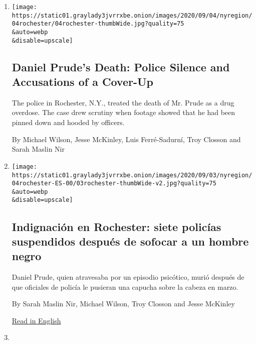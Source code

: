 \begin{enumerate}
\def\labelenumi{\arabic{enumi}.}
\item
  \href{/2020/09/04/nyregion/rochester-police-daniel-prude.html}{}

  \texttt{[image: https://static01.graylady3jvrrxbe.onion/images/2020/09/04/nyregion/04rochester/04rochester-thumbWide.jpg?quality=75\\\&auto=webp\\\&disable=upscale]}

  \hypertarget{daniel-prudes-death-police-silence-and-accusations-of-a-cover-up}{%
  \subsection{Daniel Prude's Death: Police Silence and Accusations of a
  Cover-Up}\label{daniel-prudes-death-police-silence-and-accusations-of-a-cover-up}}

  The police in Rochester, N.Y., treated the death of Mr. Prude as a
  drug overdose. The case drew scrutiny when footage showed that he had
  been pinned down and hooded by officers.

  By Michael Wilson, Jesse McKinley, Luis Ferré-Sadurní, Troy Closson
  and Sarah Maslin Nir
\item
  \href{/es/2020/09/04/espanol/estados-unidos/daniel-prude-rochester-policia.html}{}

  \texttt{[image: https://static01.graylady3jvrrxbe.onion/images/2020/09/03/nyregion/04rochester-ES-00/03rochester-thumbWide-v2.jpg?quality=75\\\&auto=webp\\\&disable=upscale]}

  \hypertarget{indignaciuxf3n-en-rochester-siete-policuxedas-suspendidos-despuuxe9s-de-sofocar-a-un-hombre-negro}{%
  \subsection{Indignación en Rochester: siete policías suspendidos
  después de sofocar a un hombre
  negro}\label{indignaciuxf3n-en-rochester-siete-policuxedas-suspendidos-despuuxe9s-de-sofocar-a-un-hombre-negro}}

  Daniel Prude, quien atravesaba por un episodio psicótico, murió
  después de que oficiales de policía le pusieran una capucha sobre la
  cabeza en marzo.

  By Sarah Maslin Nir, Michael Wilson, Troy Closson and Jesse McKinley

  \href{https://www.nytimes3xbfgragh.onion/2020/09/03/nyregion/daniel-prude-police-rochester.html}{Read
  in English}
\item
  \href{/2020/09/03/nyregion/daniel-prude-police-rochester.html}{}


\end{enumerate}
